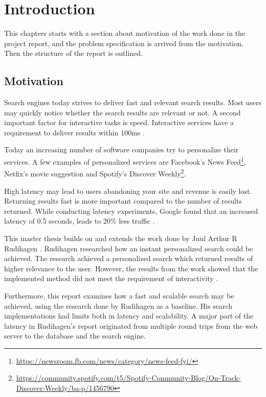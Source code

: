 \chapter{Introduction}
\label{ch:introduction}
This chapters starts with a section about motivation of the work done in the project report,
and the problem specification is arrived from the motivation.
Then the structure of the report is outlined.

\section{Motivation}
Search engines today strives to deliver fast and relevant search results.
Most users may quickly notice whether the search results are relevant or not.
A second important factor for interactive tasks is speed.
Interactive services have a requirement to deliver results within 100ms \cite{google-latency}.

Today an increasing number of software companies try to personalize their services.
A few examples of personalized services are Facebook's News Feed\footnote{\url{https://newsroom.fb.com/news/category/news-feed-fyi/}},
Netfix's movie suggestion \cite{netflix-recommendation} and Spotify's Discover Weekly\footnote{\url{https://community.spotify.com/t5/Spotify-Community-Blog/On-Track-Discover-Weekly/ba-p/1456790}}.

High latency may lead to users abandoning your site and revenue is easily lost.
Returning results fast is more important compared to the number of results returned.
While conducting latency experiments, Google found that an increased latency of 0.5 seconds, leads to 20\% less traffic \cite{google-marissa}.

This master thesis builds on and extends the work done by Juul Arthur R Rudihagen \cite{master-thesis}.
Rudihagen researched how an instant personalized search could be achieved.
The research achieved a personalized search which returned results of higher relevance to the user.
However, the results from the work showed that the implemented method did not meet the requirement of interactivity \cite{master-thesis}.

Furthermore, this report examines how a fast and scalable search may be achieved, using the research done by Rudihagen as a baseline.
His search implementations had limits both in latency and scalability.
A major part of the latency in Rudihagen's report originated from multiple round trips from the web server to the database and the search engine.

